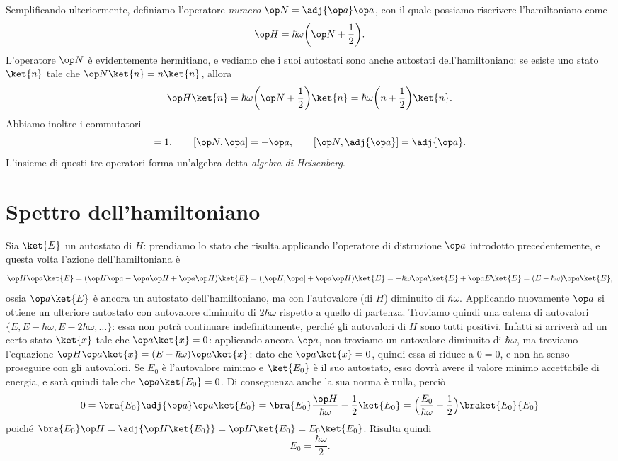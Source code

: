 Semplificando ulteriormente, definiamo l'operatore \emph{numero} $\op N=\adj{\op a}\op a$, con il quale possiamo riscrivere l'hamiltoniano come
\begin{equation}
	\op H=\hbar\omega\bigg(\op N+\frac12\bigg).
	\label{eq:hamiltoniano-numero}
\end{equation}
L'operatore $\op N$ è evidentemente hermitiano, e vediamo che i suoi autostati sono anche autostati dell'hamiltoniano: se esiste uno stato $\ket{n}$ tale che $\op N\ket{n}=n\ket{n}$, allora
\begin{equation}
	\op H\ket{n}=\hbar\omega\bigg(\op N+\frac12\bigg)\ket{n}=\hbar\omega\bigg(n+\frac12\bigg)\ket{n}.
	\label{eq:autostato-H-N}
\end{equation}
Abbiamo inoltre i commutatori
\begin{equation}
	[\op a,\adj{\op a}]=1,\qquad [\op N,\op a]=-\op a,\qquad [\op N,\adj{\op a}]=\adj{\op a}.
	\label{eq:commutatori-algebra-heisenberg}
\end{equation}
L'insieme di questi tre operatori forma un'algebra detta \emph{algebra di Heisenberg}.

\section{Spettro dell'hamiltoniano}
Sia $\ket{E}$ un autostato di $H$: prendiamo lo stato che risulta applicando l'operatore di distruzione $\op a$ introdotto precedentemente, e questa volta l'azione dell'hamiltoniana è
\begin{equation}
	\op H\op a\ket{E}=(\op H\op a-\op a\op H+\op a\op H)\ket{E}=([\op H,\op a]+\op a\op H)\ket{E}=-\hbar\omega\op a\ket{E}+\op a E\ket{E}=(E-\hbar\omega)\op a\ket{E},
\end{equation}
ossia $\op a\ket{E}$ è ancora un autostato dell'hamiltoniano, ma con l'autovalore (di $H$) diminuito di $\hbar\omega$.
Applicando nuovamente $\op a$ si ottiene un ulteriore autostato con autovalore diminuito di $2\hbar\omega$ rispetto a quello di partenza.
Troviamo quindi una catena di autovalori $\{E,E-\hbar\omega,E-2\hbar\omega,\dots\}$: essa non potrà continuare indefinitamente, perch\'e gli autovalori di $H$ sono tutti positivi.
Infatti si arriverà ad un certo stato $\ket{x}$ tale che $\op a\ket{x}=0$: applicando ancora $\op a$, non troviamo un autovalore diminuito di $\hbar\omega$, ma troviamo l'equazione $\op H\op a\ket{x}=(E-\hbar\omega)\op a\ket{x}$: dato che $\op a\ket{x}=0$, quindi essa si riduce a $0=0$, e non ha senso proseguire con gli autovalori.
Se $E_0$ è l'autovalore minimo e $\ket{E_0}$ è il suo autostato, esso dovrà avere il valore minimo accettabile di energia, e sarà quindi tale che $\op a\ket{E_0}=0$.
Di conseguenza anche la sua norma è nulla, perciò
\begin{equation}
	0=\bra{E_0}\adj{\op a}\op a\ket{E_0}=\bra{E_0}\frac{\op H}{\hbar\omega}-\frac12\ket{E_0}=\Big(\frac{E_0}{\hbar\omega}-\frac12\Big)\braket{E_0}{E_0}
\end{equation}
poich\'e $\bra{E_0}\op H=\adj{\op H\ket{E_0}}=\op H\ket{E_0}=E_0\ket{E_0}$.
Risulta quindi
\begin{equation}
	E_0=\frac{\hbar\omega}2.
	\label{eq:oscillatore-armonico-energia-minima}
\end{equation}

